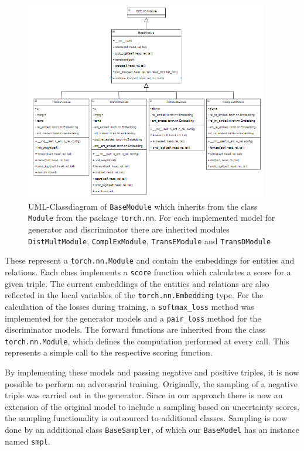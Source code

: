 \begin{figure}[t]
  \centering
    \includegraphics[width=0.95\textwidth]{figures/BaseModule.PNG}
  \caption{\ac{UML}-Classdiagram of \texttt{BaseModule} which inherits from the class \texttt{Module} from the package \texttt{torch.nn}.
  For each implemented model for generator and discriminator there are inherited modules \texttt{DistMultModule},  \texttt{ComplExModule},  \texttt{TransEModule} and  \texttt{TransDModule}}
  \label{fig:basemodule_classdiagram}
\end{figure}
These represent a \texttt{torch.nn.Module} and contain the embeddings for entities and relations.
Each class implements a \texttt{score} function which calculates a score for a given triple.
The current embeddings of the entities and relations are also reflected in the local variables of the \texttt{torch.nn.Embedding} type.
For the calculation of the losses during training, a \texttt{softmax\_loss} method was implemented for the generator models and a \texttt{pair\_loss} method for the discriminator models.
The forward functions are inherited from the class \texttt{torch.nn.Module}, which defines the computation performed at every call.
This represents a simple call to the respective scoring function.

By implementing these models and passing negative and positive triples, it is now possible to perform an adversarial training.
Originally, the sampling of a negative triple was carried out in the generator.
Since in our approach there is now an extension of the original model to include a sampling based on uncertainty scores, the sampling functionality is outsourced to additional classes.
Sampling is now done by an additional class \texttt{BaseSampler}, of which our \texttt{BaseModel} has an instance named \texttt{smpl}.
\clearpage